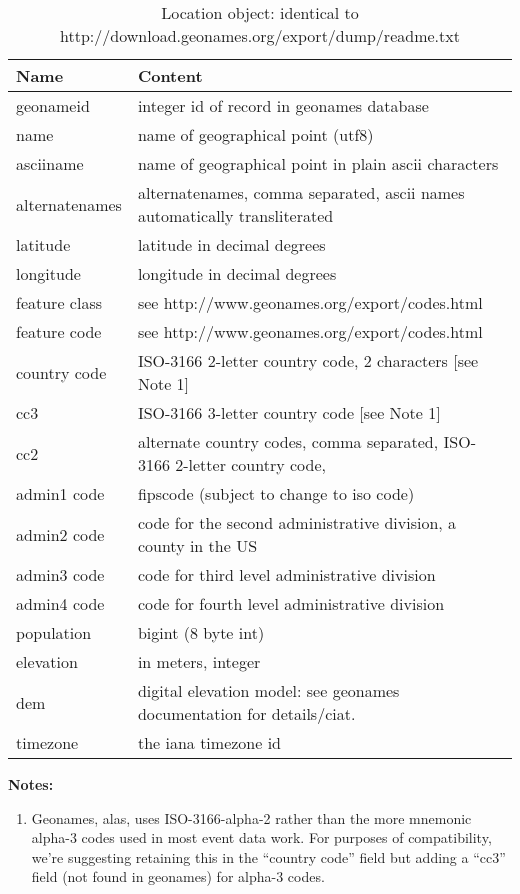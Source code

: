\documentclass[11pt]{report}
\begin{document}
\begin{table}[htp]
\caption{Location object: identical to http://download.geonames.org/export/dump/readme.txt}
\begin{center}
\begin{tabular}{|l|p{10cm}|}
\hline
Name & Content  \\
\hline
geonameid & integer id of record in geonames database \\
name & name of geographical point (utf8)\\
asciiname & name of geographical point in plain ascii characters \\
alternatenames & alternatenames, comma separated, ascii names automatically transliterated \\
latitude & latitude in decimal degrees\\
longitude & longitude in decimal degrees \\
feature class & see http://www.geonames.org/export/codes.html\\
feature code & see http://www.geonames.org/export/codes.html \\
country code & ISO-3166 2-letter country code, 2 characters [see Note 1] \\
cc3 & ISO-3166 3-letter country code [see Note 1] \\
cc2 & alternate country codes, comma separated, ISO-3166 2-letter country code,  \\
admin1 code & fipscode (subject to change to iso code)\\
admin2 code & code for the second administrative division, a county in the US \\
admin3 code & code for third level administrative division \\
admin4 code & code for fourth level administrative division \\
population & bigint (8 byte int)  \\
elevation & in meters, integer \\
dem & digital elevation model: see geonames documentation for details/ciat. \\
timezone & the iana timezone id  \\
\hline
\end{tabular}
\end{center}
\label{tab:locations}

\noindent \textbf{Notes:}
\begin{enumerate}
\item Geonames, alas, uses ISO-3166-alpha-2 rather than the more mnemonic alpha-3 codes used in most event data work. For purposes 
of compatibility, we're suggesting retaining this in the ``country code'' field but adding a ``cc3'' field (not found in geonames) for
alpha-3 codes.
\end{enumerate}
\end{table}
\end{document}
